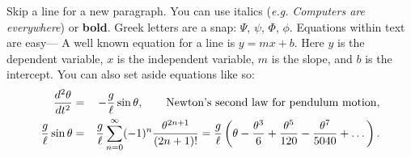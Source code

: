 \documentclass{article}
\begin{document}
Skip a line for a new paragraph.   
You can use italics ({\em e.g.} {\em  Computers are everywhere}) or {\bf bold}.
Greek letters are a snap: $\Psi$, $\psi$,
$\Phi$, $\phi$.  Equations within text are easy---
A well known equation for a line is $y=mx+b$. Here $y$ is the dependent variable, $x$ is the independent variable, $m$ is the slope, and $b$ is the intercept.
You can also set aside equations like so:
\begin{eqnarray}
{d^2 \theta \over dt^2} &=& -{g \over \ell} \sin \theta, \qquad \mbox{Newton's second law for pendulum motion}, \label{ee} \\
{g \over \ell} \sin \theta &=& {g \over \ell} \sum_{n=0}^\infty (-1)^{n} {\theta^{2n+1} \over (2n+1)!} =
{g \over \ell} \left( \theta - {\theta^3 \over 6} + {\theta^5 \over 120} - {\theta^7 \over 5040} + \dots \right). \label{e1}
\end{eqnarray}
\end{document}
